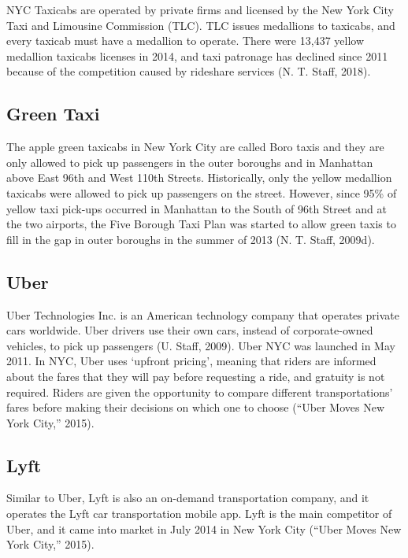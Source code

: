 \documentclass[12pt,twoside]{reedthesis}
\theoremstyle{definition}
\theoremstyle{definition}
\theoremstyle{definition}
\theoremstyle{remark}
\begin{document}
NYC Taxicabs are operated by private firms and licensed by the New York
City Taxi and Limousine Commission (TLC). TLC issues medallions to
taxicabs, and every taxicab must have a medallion to operate. There were
13,437 yellow medallion taxicabs licenses in 2014, and taxi patronage
has declined since 2011 because of the competition caused by rideshare
services (N. T. Staff, 2018).

\subsection{Green Taxi}\label{green-taxi}

The apple green taxicabs in New York City are called Boro taxis and they
are only allowed to pick up passengers in the outer boroughs and in
Manhattan above East 96th and West 110th Streets. Historically, only the
yellow medallion taxicabs were allowed to pick up passengers on the
street. However, since 95\% of yellow taxi pick-ups occurred in
Manhattan to the South of 96th Street and at the two airports, the Five
Borough Taxi Plan was started to allow green taxis to fill in the gap in
outer boroughs in the summer of 2013 (N. T. Staff, 2009d).

\subsection{Uber}\label{uber}

Uber Technologies Inc. is an American technology company that operates
private cars worldwide. Uber drivers use their own cars, instead of
corporate-owned vehicles, to pick up passengers (U. Staff, 2009). Uber
NYC was launched in May 2011. In NYC, Uber uses `upfront pricing',
meaning that riders are informed about the fares that they will pay
before requesting a ride, and gratuity is not required. Riders are given
the opportunity to compare different transportations' fares before
making their decisions on which one to choose (``Uber Moves New York
City,'' 2015).

\subsection{Lyft}\label{lyft}

Similar to Uber, Lyft is also an on-demand transportation company, and
it operates the Lyft car transportation mobile app. Lyft is the main
competitor of Uber, and it came into market in July 2014 in New York
City (``Uber Moves New York City,'' 2015).
\end{document}
